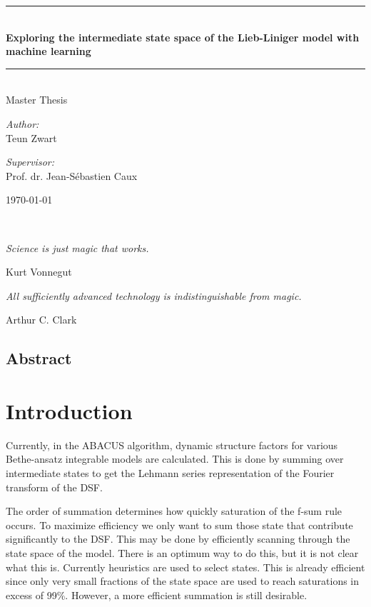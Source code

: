 \documentclass[11pt, a4paper]{report} %
\newcommand\TITLE{Exploring the intermediate state space of the Lieb-Liniger model with machine learning}
\newcommand\THESISFORM{Master Thesis}
\newcommand\AUTHOR{Teun Zwart}
\newcommand\SUPERVISOR{Prof. dr. Jean-Sébastien Caux}
\newcommand\UNIVERSITYLOGO{} %
\begin{document}
\begin{titlepage}
	\begin{center}
		\rule{\textwidth}{0.4mm}\\[0.5cm]
		\huge{\textbf{\TITLE}}
		\rule{\textwidth}{0.4mm}\\[0.5cm]
		\Large{\THESISFORM}\\[0.5cm]
		\begin{minipage}[t]{0.4\textwidth}
			\begin{flushleft}
				\large\emph{Author:}\\{\AUTHOR}
			\end{flushleft}
		\end{minipage}
		\begin{minipage}[t]{0.4\textwidth}
			\begin{flushright}
				\large\emph{Supervisor:}\\{\SUPERVISOR}
			\end{flushright}
		\end{minipage}
		\vfill
		\large \today\\
	\end{center}
\end{titlepage}

\newpage
\thispagestyle{empty}

\ 
\vspace{4cm}

\epigraph{\itshape Science is just magic that works.}{Kurt Vonnegut}

\epigraph{\itshape All sufficiently advanced technology is indistinguishable from magic.}{Arthur C. Clark}


\tableofcontents

\newpage

\section*{Abstract}

\chapter{Introduction}

Currently, in the ABACUS algorithm, dynamic structure factors for various Bethe-ansatz integrable models are calculated.
This is done by summing over intermediate states to get the Lehmann series representation of the Fourier transform of the DSF.

The order of summation determines how quickly saturation of the f-sum rule occurs.
To maximize efficiency we only want to sum those state that contribute significantly to the DSF.
This may be done by efficiently scanning through the state space of the model.
There is an optimum way to do this, but it is not clear what this is.
Currently heuristics are used to select states.
This is already efficient since only very small fractions of the state space are used to reach saturations in excess of 99\%.
However, a more efficient summation is still desirable.
\end{document}
